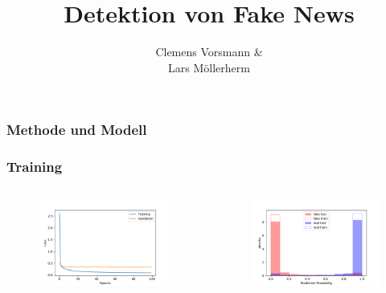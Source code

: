 \documentclass[aspectratio=1610, professionalfonts, 9pt]{beamer}
\title{Detektion von Fake News}
\author{%
  Clemens Vorsmann \& \\ 
  Lars Möllerherm
}
\institute{Fakultät Physik}
\begin{document}
  \begin{frame}
    \titlepage
  \end{frame}

  \begin{frame}
    \frametitle{Methode und Modell}
  \end{frame}

  \begin{frame}
    \frametitle{Training}
    \begin{columns}
      \begin{figure}
          \includegraphics[width=\textwidth]{pictures/bow/history_bow_best.pdf}
          \caption{}
          \label{}
      \end{figure}
      
      \begin{figure}
          \includegraphics[width=\textwidth]{pictures/bow/prob_bow_best_nn.pdf}
          \caption{}
          \label{}
      \end{figure}
      
    \end{columns}
  \end{frame}
\end{document}
